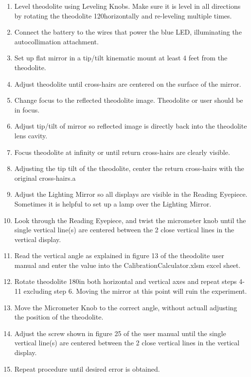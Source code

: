 \documentclass[a4paper,12pt]{article}
\begin{document}
	\begin{enumerate}
	\item Level theodolite using Leveling Knobs. Make sure it is level in all directions by rotating the theodolite 120\degree horizontally and re-leveling multiple times.
	\item Connect the battery to the wires that power the blue LED, illuminating the autocollimation attachment.
	\item Set up flat mirror in a tip/tilt kinematic mount  at least 4 feet from the theodolite.
	\item Adjust theodolite until cross-hairs are centered on the surface of the mirror.
	\item Change focus to the reflected theodolite image. Theodolite or user should be in focus.
	\item Adjust tip/tilt of mirror so reflected image is directly back into the theodolite lens cavity.
	\item Focus theodolite at infinity or until return cross-hairs are clearly visible.
	\item Adjusting the tip tilt of the theodolite, center the return cross-hairs with the original cross-hairs.a
	\item Adjust the Lighting Mirror so all displays are visible in the Reading Eyepiece. Sometimes it is helpful to set up a lamp over the Lighting Mirror.
	\item Look through the Reading Eyepiece, and twist the micrometer knob until the single vertical line(s) are centered between the 2 close vertical lines in the vertical display.
	\item Read the vertical angle as explained in figure 13 of the theodolite user manual and enter the value into the CalibrationCalculator.xlsm excel sheet.
	\item Rotate theodolite 180\degree in both horizontal and vertical axes and repeat steps 4-11 excluding step 6. Moving the mirror at this point will ruin the experiment.
	\item Move the Micrometer Knob to the correct angle, without actuall adjusting the position of the theodolite.
	\item Adjust the screw shown in figure 25 of the user manual until the single vertical line(s) are centered between the 2 close vertical lines in the vertical display.
	\item Repeat procedure until desired error is obtained.
	\end{enumerate}
\end{document}
